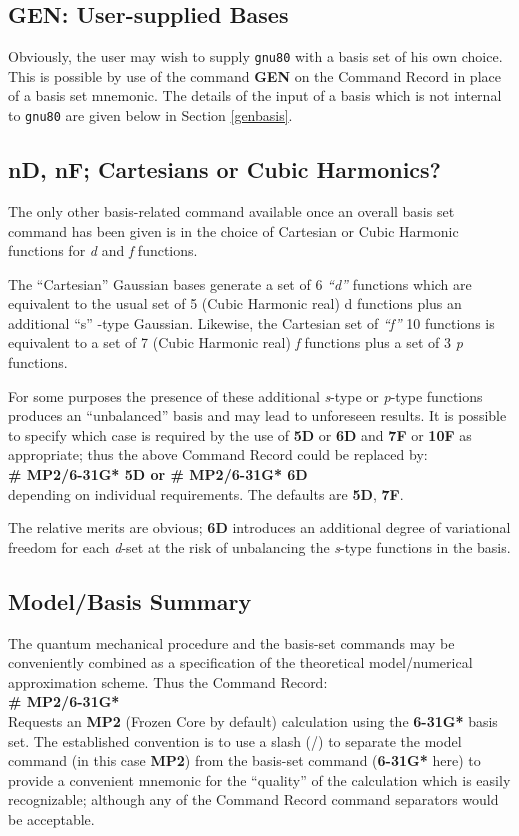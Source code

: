 \subsection{\sf GEN: User-supplied Bases}
Obviously, the user may wish to supply {\tt gnu80}
with a basis set of his own choice. This is possible
by use of the command {\bf GEN} on
the Command Record in place of a basis set mnemonic.
The details of the input of a basis which is not internal to {\tt gnu80}
are given below in Section \ref{genbasis}.
\subsection{\sf nD, nF; Cartesians or Cubic Harmonics?}
The only other basis-related command  available once an
overall  basis set command
has been given is in the choice of Cartesian or Cubic
Harmonic functions for {\em d} and {\em f} functions.

The ``Cartesian'' Gaussian bases generate a set
of 6 {\em ``d'' } functions which are equivalent to the
usual set of 5 (Cubic Harmonic real) d functions plus
an additional ``s'' -type Gaussian.
Likewise, the Cartesian set of {\em ``f'' } 10 functions
is equivalent to a set of 7 (Cubic Harmonic real) {\em f } functions
plus a set of 3 {\em p } functions.

For some purposes the presence of these additional {\em s}-type 
or {\em p}-type functions produces
an ``unbalanced'' basis and may lead to unforeseen results. It is
possible to specify which case is required by the use of
{\bf 5D} or {\bf 6D} and {\bf 7F} or {\bf 10F}
as appropriate; thus the above Command Record
could be replaced by:
\ \\
\vspace{0.25cm}
{\bf \# MP2/6-31G* 5D or \# MP2/6-31G* 6D } 
\ \\
depending on individual requirements. The defaults are {\bf 5D},
{\bf 7F}.

The relative merits are obvious; {\bf 6D} introduces an additional
degree of variational freedom for each {\em d}-set at the risk
of unbalancing the {\em s}-type functions in the basis.
\subsection{\sf Model/Basis Summary}
The quantum mechanical procedure and the basis-set commands may be
conveniently combined as a specification of the theoretical model/numerical
approximation scheme.
Thus the Command Record:
\ \\
\vspace{0.25cm}
{\bf \# MP2/6-31G*}
\ \\
\vspace{0.25cm}
Requests an {\bf MP2} (Frozen Core by default) 
calculation using the {\bf 6-31G*} basis set.
The established convention is to use a slash (/) to separate
the model command (in this case {\bf MP2}) from the basis-set
command ({\bf 6-31G*} here) to provide a convenient mnemonic for
the ``quality'' of the calculation which is easily
recognizable; although any of the Command Record command separators
would be acceptable.
\newpage
